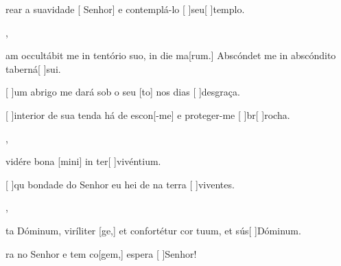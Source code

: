 {    {\item {}rear a suavidade [ Senhor] e contemplá-lo [ ]{seu}[ ]{tem}plo.~\Antiphona},
  {\item {}am occultábit me in tentório suo, in die ma[\-rum.] Abscóndet me in abscóndito taberná[ ]{su}i.~\Antiphona}%
    {\item {}[ ]{um} abrigo me dará sob o seu [to] nos dias [ ]{des}{gra}ça.~\Antiphona
      \item {}[ ]{in}terior de sua tenda há de escon[-me] e proteger-me [ ]{br}[ ]{ro}cha.~\Antiphona},
  {\item {} vidére bona [mini] in ter[ ]{vi}{vén}tium.~\Antiphona}%
    {\item {}[ ]{qu} bondade do Senhor eu hei de  na terra [ ]{vi}{ven}tes.~\Antiphona},
  {\item {}ta Dóminum, viríliter [ge,] et confor\-té\-tur cor tu\-um, et sús[ ]{Dó}minum.~\Antiphona}%
    {\item {}ra no Senhor e tem co[gem,] espera [ ]{Se}{nhor}!~\Antiphona}
}